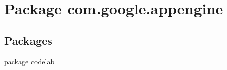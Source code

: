 \hypertarget{namespacecom_1_1google_1_1appengine}{\section{Package com.\-google.\-appengine}
\label{namespacecom_1_1google_1_1appengine}
}
\subsection*{Packages}
\begin{DoxyCompactItemize}
\item 
package \hyperlink{namespacecom_1_1google_1_1appengine_1_1codelab}{codelab}
\end{DoxyCompactItemize}
